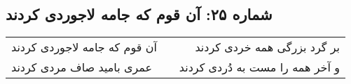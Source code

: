 \begin{center}
\section*{شماره ۲۵: آن قوم که جامه لاجوردی کردند}
\label{sec:025}
\begin{longtable}{l p{0.5cm} r}
آن قوم که جامه لاجوردی کردند
&&
بر گرد بزرگی همه خردی کردند
\\
عمری بامید صاف مردی کردند
&&
و آخر همه را مست به دُردی کردند
\\
\end{longtable}
\end{center}
